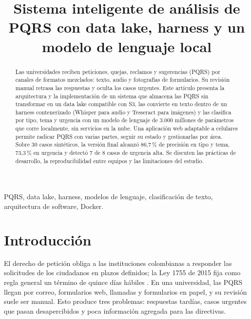\documentclass[conference]{IEEEtran}
\begin{document}
\title{Sistema inteligente de análisis de PQRS con data lake, harness y un modelo de lenguaje local}

\author{
}

\maketitle

\begin{abstract}
Las universidades reciben peticiones, quejas, reclamos y sugerencias (PQRS) por canales de formatos mezclados: texto, audio y fotografías de formularios. Su revisión manual retrasa las respuestas y oculta los casos urgentes. Este artículo presenta la arquitectura y la implementación de un sistema que almacena las PQRS sin transformar en un data lake compatible con S3, las convierte en texto dentro de un harness contenerizado (Whisper para audio y Tesseract para imágenes) y las clasifica por tipo, tema y urgencia con un modelo de lenguaje de 3.000 millones de parámetros que corre localmente, sin servicios en la nube. Una aplicación web adaptable a celulares permite radicar PQRS con varias partes, seguir su estado y gestionarlas por área. Sobre 30 casos sintéticos, la versión final alcanzó 86,7\,\% de precisión en tipo y tema, 73,3\,\% en urgencia y detectó 7 de 8 casos de urgencia alta. Se discuten las prácticas de desarrollo, la reproducibilidad entre equipos y las limitaciones del estudio.
\end{abstract}

\begin{IEEEkeywords}
PQRS, data lake, harness, modelos de lenguaje, clasificación de texto, arquitectura de software, Docker.
\end{IEEEkeywords}

\section{Introducción}
El derecho de petición obliga a las instituciones colombianas a responder las solicitudes de los ciudadanos en plazos definidos; la Ley 1755 de 2015 fija como regla general un término de quince días hábiles \cite{ley1755}. En una universidad, las PQRS llegan por correo, formularios web, llamadas y formularios en papel, y su revisión suele ser manual. Esto produce tres problemas: respuestas tardías, casos urgentes que pasan desapercibidos y poca información agregada para las directivas.
\end{document}
